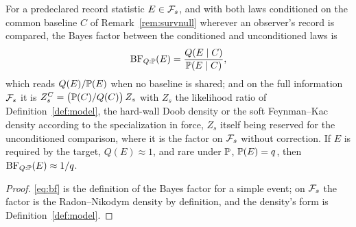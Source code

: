 \begin{proposition}\label{prop:bf}
For a predeclared record statistic $E\in\mathcal{F}_s$, and with both laws
conditioned on the common baseline $C$ of Remark~\ref{rem:survnull}
wherever an observer's record is compared, the Bayes factor between the
conditioned and unconditioned laws is
\begin{equation}\label{eq:bf}
\mathrm{BF}_{Q:\mathbb{P}}(E)=\frac{Q(E\mid C)}{\mathbb{P}(E\mid C)},
\end{equation}
which reads $Q(E)/\mathbb{P}(E)$ when no baseline is shared;
and on the full information $\mathcal{F}_s$ it is $Z^{C}_s = \bigl(\mathbb{P}(C)/Q(C)\bigr)\, Z_s$ with $Z_s$ the likelihood ratio of Definition~\ref{def:model}, the hard-wall Doob density or the soft Feynman--Kac density according to the specialization in force, $Z_s$ itself being reserved for the unconditioned comparison, where it is the factor on $\mathcal{F}_s$ without correction. If $E$ is required by the
target, $Q(E)\approx1$, and rare under $\mathbb{P}$, $\mathbb{P}(E)=q$, then
$\mathrm{BF}_{Q:\mathbb{P}}(E)\approx1/q$.
\end{proposition}

\begin{proof}
\eqref{eq:bf} is the definition of the Bayes factor for a simple event;
on $\mathcal{F}_s$ the factor is the Radon--Nikodym density by definition, and the
density's form is Definition~\ref{def:model}.
\end{proof}


